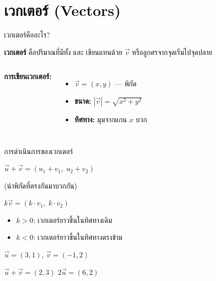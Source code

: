 \documentclass[11pt, aspectratio=169]{beamer}
\begin{document}
\section{เวกเตอร์ (Vectors)}

\begin{frame}{เวกเตอร์คืออะไร?}
  \begin{explanation}[นิยาม]
    \textbf{เวกเตอร์} คือปริมาณที่มีทั้ง  และ 
    เขียนแทนด้วย $\vec{v}$ หรือลูกศรจากจุดเริ่มไปจุดปลาย
  \end{explanation}

  \begin{columns}[T]
      \centering

      \textbf{การเขียนเวกเตอร์:}
      \begin{itemize}
        \item $\vec{v} = (x, y)$ — พิกัด
        \item \textbf{ขนาด:} $|\vec{v}| = \sqrt{x^2 + y^2}$
        \item \textbf{ทิศทาง:} มุมจากแกน $x$ บวก
      \end{itemize}
  \end{columns}
\end{frame}

\begin{frame}{การดำเนินการของเวกเตอร์}
  \begin{explanation}[การบวกเวกเตอร์]
    $\vec{u} + \vec{v} = (u_1 + v_1,\; u_2 + v_2)$

    (นำพิกัดที่ตรงกันมาบวกกัน)
  \end{explanation}

  \begin{explanation}
    $k\vec{v} = (k \cdot v_1,\; k \cdot v_2)$

    \begin{itemize}
      \item $k > 0$: เวกเตอร์ยาวขึ้นในทิศทางเดิม
      \item $k < 0$: เวกเตอร์ยาวขึ้นในทิศทางตรงข้าม
    \end{itemize}
  \end{explanation}

  \begin{exambox}[ตัวอย่าง]
    $\vec{u} = (3, 1)$, $\vec{v} = (-1, 2)$

    $\vec{u} + \vec{v} = (2, 3)$ \qquad $2\vec{u} = (6, 2)$
  \end{exambox}
\end{frame}
\end{document}
